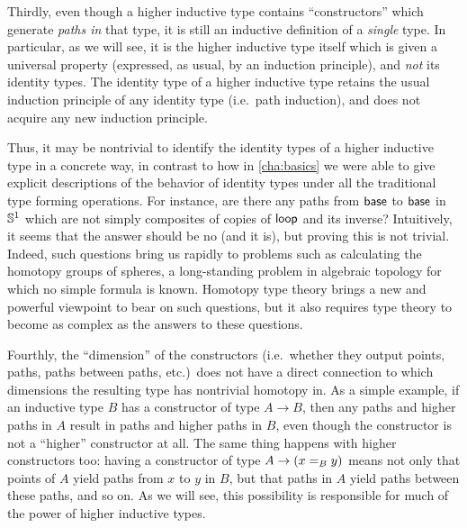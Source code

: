 Thirdly, even though a higher inductive type contains ``constructors'' which generate \emph{paths in} that type, it is still an inductive definition of a \emph{single} type.
In particular, as we will see, it is the higher inductive type itself which is given a universal property (expressed, as usual, by an induction principle), and \emph{not} its identity types.
The identity type of a higher inductive type retains the usual induction principle of any identity type (i.e.\ path induction), and does not acquire any new induction principle.

Thus, it may be nontrivial to identify the identity types of a higher inductive type in a concrete way, in contrast to how in \autoref{cha:basics} we were able to give explicit descriptions of the behavior of identity types under all the traditional type forming operations.
For instance, are there any paths from $\base$ to $\base$ in $\Sn^1$ which are not simply composites of copies of $\lloop$ and its inverse?
Intuitively, it seems that the answer should be no (and it is), but proving this is not trivial.
Indeed, such questions bring us rapidly to problems such as calculating the homotopy groups of spheres, a long-standing problem in algebraic topology for which no simple formula is known.
Homotopy type theory brings a new and powerful viewpoint to bear on such questions, but it also requires type theory to become as complex as the answers to these questions.

%
Fourthly, the ``dimension'' of the constructors (i.e.\ whether they output points, paths, paths between paths, etc.)\ does not have a direct connection to which dimensions the resulting type has nontrivial homotopy in.
As a simple example, if an inductive type $B$ has a constructor of type $A\to B$, then any paths and higher paths in $A$ result in paths and higher paths in $B$, even though the constructor is not a ``higher'' constructor at all.
The same thing happens with higher constructors too: having a constructor of type $A\to (\id[B]xy)$ means not only that points of $A$ yield paths from $x$ to $y$ in $B$, but that paths in $A$ yield paths between these paths, and so on.
As we will see, this possibility is responsible for much of the power of higher inductive types.

